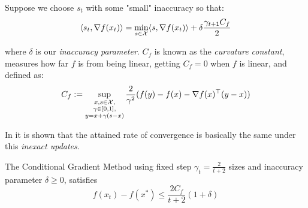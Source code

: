 Suppose we choose $s_t$ with some "small" inaccuracy so that:
\begin{equation}
      \langle s_t, \nabla f(x_t) \rangle = \min_{s \in \mathcal{X} } \langle s, \nabla f(x_t) \rangle + \delta \frac{\gamma_{t+1}C_f}{2}
\end{equation}

where $\delta$ is our \emph{inaccuracy parameter}. $C_f$ is known as the \emph{curvature constant}, measures how far $f$ is from being linear, getting $C_f=0$ when $f$ is linear, and defined as:
\begin{equation} \label{eq:curv_const}
C_f := \sup_{ \substack{x,s \in \mathcal{X},\\ \gamma \in [0,1],\\ y=x+\gamma(s-x)} } \frac{2}{\gamma^2} (f(y)-f(x)-\nabla f(x)^\top (y-x))
\end{equation}


In \cite{Jaggi2013} it is shown that the attained rate of convergence is basically the same under this \emph{inexact updates}.

\begin{theorem}
The Conditional Gradient Method using fixed step $\gamma_t=\frac{2}{t+2}$ sizes and inaccuracy parameter $\delta \geq 0$,
satisfies
\begin{equation}
f(x_t)-f(x^*) \leq \frac{2 C_f }{t+2} (1+\delta)
\end{equation}
\end{theorem}

